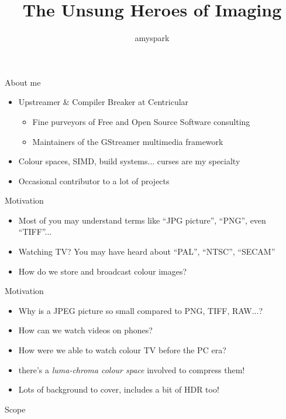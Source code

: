 \documentclass[aspectratio=169,handout,usepdftitle=false]{fireshonks}
\title{The Unsung Heroes of Imaging}
\author{amyspark}
\date{\DTMdate{2023-12-27}}
\begin{document}
\maketitle

\begin{frame}{About me}
    \begin{itemize}[<*>]
        \item Upstreamer \& Compiler Breaker at Centricular
              \begin{itemize}[<*>]
                  \item Fine purveyors of Free and Open Source Software consulting
                  \item Maintainers of the GStreamer multimedia framework
              \end{itemize}
        \item Colour spaces, SIMD, build systems... curses are my specialty 
        \item Occasional contributor to a lot of projects
    \end{itemize}
\end{frame}
\begin{frame}{Motivation}
    \begin{itemize}
        \item Most of you may understand terms like \enquote{JPG picture}, \enquote{PNG}, even \enquote{TIFF}...
        \item Watching TV? You may have heard about \enquote{PAL}, \enquote{NTSC}, \enquote{SECAM}
        \item How do we store and broadcast colour images?
    \end{itemize}
\end{frame}

\begin{frame}{Motivation}
    \begin{itemize}
        \item Why is a JPEG picture so small compared to PNG, TIFF, RAW...?
        \item How can we watch  videos on phones?
        \item How were we able to watch colour TV before the PC era?
        \item {} there's a \emph{luma-chroma colour space} involved to compress them!
        \item Lots of background to cover, includes a bit of HDR too!
    \end{itemize}
\end{frame}
\begin{frame}{Scope}
    \tableofcontents
\end{frame}
\end{document}

